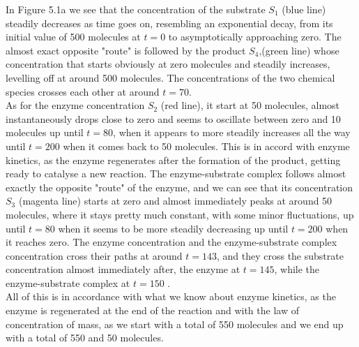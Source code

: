 In Figure 5.1a we see that the concentration of the substrate $S_{1}$ (blue line) steadily decreases as time goes on, resembling an exponential decay, from its initial value of 500 molecules at $t=0$ to asymptotically approaching zero. The almost exact opposite "route" is followed by the product $S_{4}$,(green line) whose concentration that starts obviously at zero molecules and steadily increases, levelling off at around 500 molecules. The concentrations of the two chemical species crosses each other at around $t=70$.\\
As for the enzyme concentration $S_{2}$ (red line), it start at 50 molecules, almost instantaneously drops close to zero and seems to oscillate between zero and 10 molecules up until $t=80$, when it appears to more steadily increases all the way until $t=200$ when it comes back to 50 molecules. This is in accord with enzyme kinetics, as the enzyme regenerates after the formation of the product, getting ready to catalyse a new reaction. The enzyme-substrate complex follows almost exactly the opposite "route" of the enzyme, and we can see that its concentration $S_{3}$ (magenta line) starts at zero and almost immediately peaks at around 50 molecules, where it stays pretty much constant, with some minor fluctuations, up until $t=80$ when it seems to be more steadily decreasing up until $t=200$ when it reaches zero. The enzyme concentration and the enzyme-substrate complex concentration cross their paths at around $t=143$, and they cross the substrate concentration almost immediately after, the enzyme at $t=145$, while the enzyme-substrate complex at $t=150$ .\\
All of this is in accordance with what we know about enzyme kinetics, as the enzyme is regenerated at the end of the reaction and with the law of concentration of mass, as we start with a total of 550 molecules and we end up with a total of 550 and 50 molecules.\\

